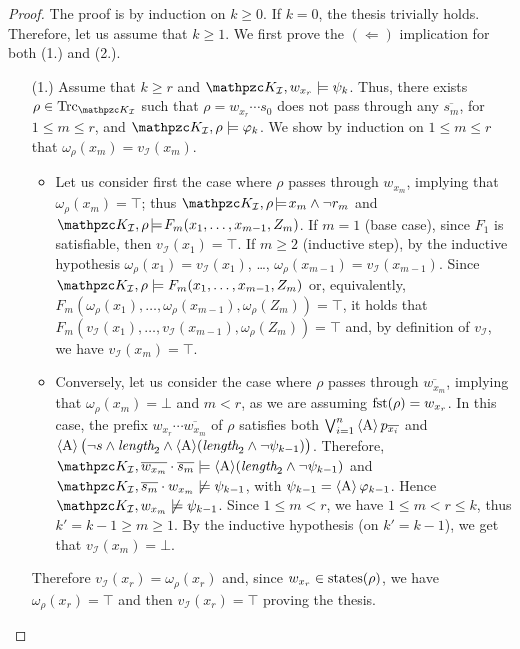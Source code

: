 \begin{proof}
The proof is by induction on $k\geq 0$. If $k=0$, the thesis trivially holds.
Therefore, let us assume that $k\geq 1$. We first prove the $(\Leftarrow)$ implication for both (1.) and (2.).
\begin{itemize}
\item[(1.)] Assume that $k\geq r$ and $\Ku_\mathcal{I},w_{x_r}\models \psi_k$. Thus, there exists $\rho\in\Trk_{\Ku_\mathcal{I}}$ such that $\rho=w_{x_r}\cdots s_0$ does not pass through any $\overline{s_m}$, for $1\leq m\leq r$, and $\Ku_\mathcal{I},\rho\models \varphi_k$. We show by induction on $1\leq m\leq r$ that $\omega_\rho(x_m)=v_\mathcal{I}(x_m)$. 
%
	\begin{itemize}
		\item Let us consider first the case where $\rho$ passes through $w_{x_m}$, implying that $\omega_\rho(x_m)=\top$; thus $\Ku_\mathcal{I},\rho\!\models\! x_m\wedge \neg r_m$ and $\Ku_\mathcal{I},\rho\!\models\! F_m(x_1,\ldots ,x_{m-1},\allowbreak Z_m)$. If $m=1$ (base case), since $F_1$ is satisfiable, then $v_\mathcal{I}(x_1)=\top$. If $m\geq 2$ (inductive step), by the inductive hypothesis $\omega_\rho(x_1)=v_\mathcal{I}(x_1)$, \dots , $\omega_\rho(x_{m-1})=v_\mathcal{I}(x_{m-1})$. Since $\Ku_\mathcal{I},\rho\models F_m(x_1,\ldots ,x_{m-1},Z_m)$ or, equivalently, $F_m(\omega_\rho(x_{1}),\ldots ,\allowbreak \omega_\rho(x_{m-1}), \omega_\rho(Z_m))=\top$, it holds that $F_m(v_\mathcal{I}(x_{1}),\ldots , v_\mathcal{I}(x_{m-1}), \allowbreak  \omega_\rho(Z_m))=\top$ and, by definition of $v_\mathcal{I}$, we have $v_\mathcal{I}(x_m)=\top$.
		
		\item Conversely, let us consider the case where $\rho$ passes through $\overline{w_{x_m}}$, implying that $\omega_\rho(x_m)=\bot$ and $m<r$, as we are assuming $\operatorname{fst}(\rho)=w_{x_r}$. In this case, the prefix $w_{x_r}\cdots \overline{w_{x_m}}$ of $\rho$ satisfies both $\bigvee_{i=1}^n \operatorname{\langle A\rangle} p_{\overline{x_i}}$ and $\operatorname{\langle A\rangle}\big(\neg s \wedge \textit{length}_2\wedge \operatorname{\langle A\rangle} (\textit{length}_2\wedge \neg\psi_{k-1})\big)$. Therefore, $\Ku_\mathcal{I},\overline{w_{x_m}}\cdot \overline{s_m}\models \hsA (\Length_2\wedge \neg\psi_{k-1})$ and $\Ku_\mathcal{I}, \overline{s_m}\cdot w_{x_m}\not\models \psi_{k-1}$, with $\psi_{k-1}=\operatorname{\langle A\rangle}\varphi_{k-1}$. Hence $\Ku_\mathcal{I}, w_{x_m}\not\models \psi_{k-1}$. Since $1\leq m<r$, we have $1\leq m<r\leq k$, thus $k'=k-1\geq m\geq 1$. By the inductive hypothesis (on $k'=k-1$), we get that $v_\mathcal{I}(x_m)=\bot$.
	\end{itemize}
Therefore $v_\mathcal{I}(x_r)=\omega_\rho(x_r)$ and, since $w_{x_r}\in\operatorname{states}(\rho)$, we have $\omega_\rho(x_r)=\top$ and then $v_\mathcal{I}(x_r)=\top$ proving the thesis.
	

\end{itemize}
\end{proof}
